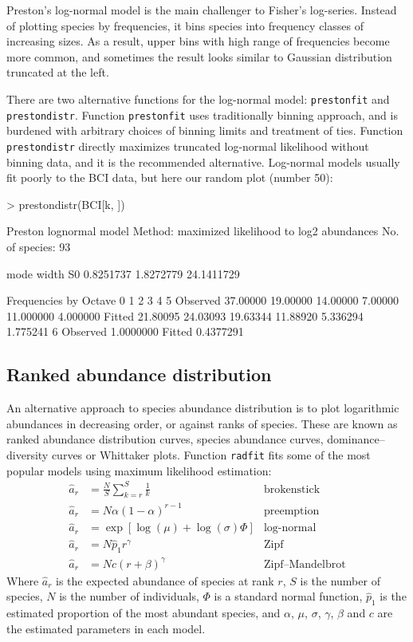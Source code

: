 \documentclass[a4paper,10pt]{amsart}
\begin{document}
Preston's log-normal model is the main challenger to Fisher's
log-series.  Instead of plotting species by frequencies, it bins
species into frequency classes of increasing sizes.  As a result,
upper bins with high range of frequencies become more common, and
sometimes the result looks similar to Gaussian distribution truncated
at the left.

There are two alternative functions for the log-normal model:
\texttt{prestonfit} and \texttt{prestondistr}.  Function
\texttt{prestonfit} uses traditionally binning approach, and is burdened
with arbitrary choices of binning limits and treatment of ties.
Function \texttt{prestondistr} directly
maximizes truncated log-normal likelihood without binning data, and it
is the recommended alternative.  Log-normal models  usually fit poorly
to the BCI data, but here our random plot (number 50):
\begin{Schunk}
\begin{Sinput}
> prestondistr(BCI[k, ])
\end{Sinput}
\begin{Soutput}
Preston lognormal model
Method: maximized likelihood to log2 abundances 
No. of species: 93 

      mode      width         S0 
 0.8251737  1.8272779 24.1411729 

Frequencies by Octave
                0        1        2        3         4        5
Observed 37.00000 19.00000 14.00000  7.00000 11.000000 4.000000
Fitted   21.80095 24.03093 19.63344 11.88920  5.336294 1.775241
                 6
Observed 1.0000000
Fitted   0.4377291
\end{Soutput}
\end{Schunk}

\subsection{Ranked abundance distribution}

An alternative approach to species abundance distribution is to plot
logarithmic abundances in decreasing order, or against ranks of
species.  These are known as ranked abundance
distribution curves, species abundance curves, dominance--diversity
curves or Whittaker plots.
Function \texttt{radfit} fits some of the most popular models using
maximum likelihood estimation:
\begin{align}
\hat a_r &= \frac{N}{S} \sum_{k=r}^S \frac{1}{k} &\text{brokenstick}\\
\hat a_r &= N \alpha (1-\alpha)^{r-1} & \text{preemption} \\
\hat a_r &= \exp \left[\log (\mu) + \log (\sigma) \Phi \right]
&\text{log-normal}\\
\hat a_r &= N \hat p_1 r^\gamma &\text{Zipf}\\
\hat a_r &= N c (r + \beta)^\gamma &\text{Zipf--Mandelbrot}
\end{align}
Where $\hat a_r$ is the expected abundance of species at rank $r$, $S$
is the number of species, $N$ is the number of individuals, $\Phi$ is
a standard normal function, $\hat p_1$ is the estimated proportion of
the most abundant species, and $\alpha$, $\mu$, $\sigma$, $\gamma$,
$\beta$ and $c$ are the estimated parameters in each model.
\end{document}
